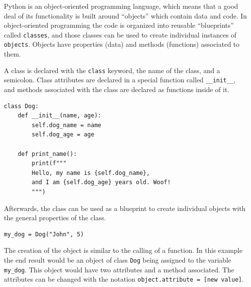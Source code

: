 \documentclass[a4paper,12pt]{article}
\begin{document}
Python is an object-oriented programming language, which means that a good deal of its functionality is built around ``objects'' which contain data and code. In object-oriented programming the code is organized into reusable ``blueprints'' called \verb|classes|, and those classes can be used to create individual instances of \verb|objects|. Objects have properties (data) and methods (functions) associated to them.

A class is declared with the \verb|class| keyword, the name of the class, and a semicolon. Class attributes are declared in a special function called \verb|__init__|, and methods associated with the class are declared as functions inside of it.

\begin{tcolorbox}[
    enhanced,
    attach boxed title to top left={xshift=6mm,yshift=-3mm},
    colback=lightgreen!20,
    colframe=lightgreen,
    colbacktitle=lightgreen,
    title=Python,
    fonttitle=\bfseries\color{black},
    boxed title style={size=small,colframe=lightgreen,sharp corners},
    sharp corners,
    ]
    \begin{verbatim}
class Dog:
    def __init__(name, age):
        self.dog_name = name
        self.dog_age = age

    def print_name():
        print(f"""
        Hello, my name is {self.dog_name},
        and I am {self.dog_age} years old. Woof!
        """)
    \end{verbatim}
\end{tcolorbox}

Afterwards, the class can be used as a blueprint to create individual objects with the general properties of the class.

\begin{tcolorbox}[
    enhanced,
    attach boxed title to top left={xshift=6mm,yshift=-3mm},
    colback=lightgreen!20,
    colframe=lightgreen,
    colbacktitle=lightgreen,
    title=Python,
    fonttitle=\bfseries\color{black},
    boxed title style={size=small,colframe=lightgreen,sharp corners},
    sharp corners,
    ]
    \begin{verbatim}
my_dog = Dog("John", 5)
    \end{verbatim}
\end{tcolorbox}

The creation of the object is similar to the calling of a function. In this example the end result would be an object of class \verb|Dog| being assigned to the variable \verb|my_dog|. This object would have two attributes and a method associated. The attributes can be changed with the notation \verb|object.attribute = [new value]|.
\end{document}
